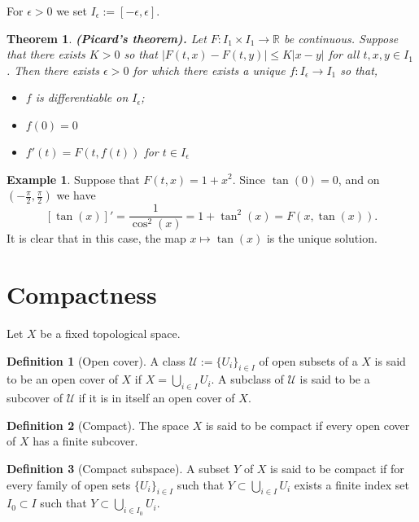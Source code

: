 \documentclass[11pt,a4paper]{article}
\theoremstyle{definition}
\newtheorem{definition}{Definition}[section]
\newtheorem{example}{Example}[section]
\theoremstyle{plain}
\newtheorem{theorem}{Theorem}[section]
\newcommand{\R}{\mathbb{R}}
\newcommand{\abs}[1]{\left\lvert #1\right\rvert}
\renewcommand{\tt}[1]{\textnormal{\textbf{(#1).}}} %
\begin{document}
  For $\epsilon > 0$ we set $I_\epsilon := [-\epsilon, \epsilon]$.

  \begin{theorem}
    \tt{Picard's theorem}
    Let $F \colon I_1 \times I_1 \to \R$ be continuous. Suppose that there 
    exists $K > 0$ so that $\abs{F(t,x) - F(t,y)} \le K\abs{x - y}$ for all 
    $t, x, y \in I_1$. Then there exists $\epsilon > 0$ for which there 
    exists a unique $f \colon I_{\epsilon} \to I_{1}$ so that,
    \begin{itemize}
      \item $f$ is differentiable on $I_{\epsilon}$;
      \item $f(0)=0$
      \item $f'(t) = F(t,f(t))$ for $t \in I_{\epsilon}$
    \end{itemize}
  \end{theorem}
  \begin{example}
    Suppose that $F(t,x) = 1 + x^2$. Since $\tan(0) = 0$, and on 
    $\left(- \frac{\pi}{2}, \frac{\pi}{2}\right)$ we have
    \[
      [\tan(x)]' = \frac{1}{\cos^2(x)} = 1 + \tan^2(x) = F(x,\tan(x)).
    \]
    It is clear that in this case, the map $x \mapsto \tan(x)$ is the unique
    solution.
  \end{example}

  \newpage

  \section{Compactness}\label{sec:compactness}
  Let $X$ be a fixed topological space.
  \begin{definition}[Open cover]
    A class $\mathcal{U} := \{U_i\}_{i \in I}$ of open subsets of a
    $X$ is said to be an open cover of $X$ if 
    $X = \bigcup_{i \in I} U_i$. A subclass of $\mathcal{U}$ is said
    to be a subcover of $\mathcal{U}$ if it is in itself an open cover
    of $X$.
  \end{definition}

  \begin{definition}[Compact]
    The space $X$ is said to be compact if every open cover of $X$
    has a finite subcover.
  \end{definition}

  \begin{definition}[Compact subspace]
    A subset $Y$ of $X$ is said to be compact if for every family of open
    sets $\{U_i\}_{i \in I}$ such that $Y \subset \bigcup_{i \in I} U_i$
    exists a finite index set $I_0 \subset I$ such that 
    $Y \subset \bigcup_{i \in I_0} U_i$.
  \end{definition}
\end{document}
